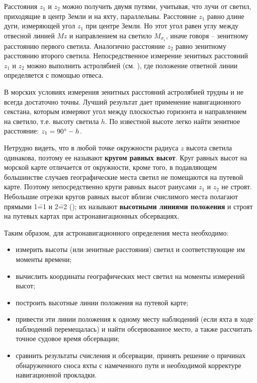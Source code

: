 Расстояния $z_1$ и $z_2$ можно получить двумя путями, учитывая, что
лучи от светил, приходящие в центр Земли и на яхту,
параллельны. Расстояние $z_1$ равно длине дуги, измеряющей угол $z_1$
при центре Земли. Но этот угол равен углу между отвесной линией $Mz$ и
направлением на светило $M_{\sigma_1}$, иначе говоря \--- зенитному
расстоянию первого светила. Аналогично расстояние $z_2$ равно
зенитному расстоянию второго светила. Непосредственное измерение
зенитных расстояний $z_1$ и $z_2$ можно выполнить астролябией
(см. ), где положение ответной линии определяется с помощью
отвеса.

В морских условиях измерения зенитных расстояний астролябией трудны и
не всегда достаточно точны. Лучший результат дает применение
навигационного секстана, которым измеряют угол между плоскостью
горизонта и направлением на светило, т.е. высоту светила $h$. По
известной высоте легко найти зенитное расстояние: $z_1 = 90^\circ - h$.

Нетрудно видеть, что в любой точке окружности радиуса $z$ высота светила
одинакова, поэтому ее называют \textbf{кругом равных высот}. Круг равных высот
на морской карте отличается от окружности, кроме того, в подавляющем
большинстве случаев географические места светил не помещаются на
путевой карте. Поэтому непосредственно круги равных высот раиусами $z_1$
и $z_2$ не строят. Небольшие отрезки кругов равных высот вблизи
счислимого места полагают прямыми 1\==1 и 2\==2 (); их называют
\textbf{высотными линиями положения} и строят на путевых картах при
астронавигационных обсервациях.

Таким образом, для астронавигационного определения места необходимо:

\begin{itemize}
\item измерить высоты (или зенитные расстояния) светил и
  соответствующие им моменты времени;
\item вычислить координаты географических мест светил на моменты
  измерений высот;
\item построить высотные линии положения на путевой карте;
\item привести эти линии положения к одному месту наблюдений (если
  яхта в ходе наблюдений перемещалась) и найти обсервованное место, а
  также рассчитать точное судовое время обсервации;
\item сравнить результаты счисления и обсервации, принять решение о
  причинах обнаруженного сноса яхты с намеченного пути и необходимой
  корректуре навигационной прокладки.
\end{itemize}

